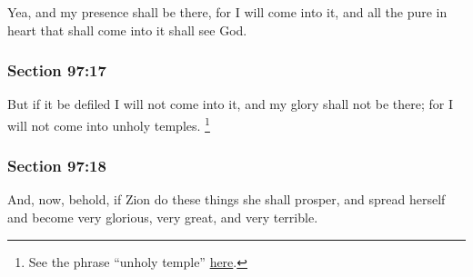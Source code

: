 		Yea, and my presence shall be there, for I will come into it, and all the pure in heart that shall come into it shall see God.


	\subsubsection{Section 97:17} %
		\label{DC97-17}

		But if it be defiled I will not come into it, and my glory shall not be there; for I will not come into unholy temples.%
			\footnote{%
				See the phrase ``unholy temple'' \hyperref[TEMPLE-PHRASES]{here}.
				}


	\subsubsection{Section 97:18} %
		\label{DC97-18}

		And, now, behold, if Zion do these things she shall prosper, and spread herself and become very glorious, very great, and very terrible.


